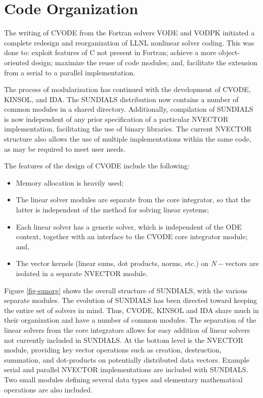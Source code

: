 \section{Code Organization}
\label{s:organization}

The writing of CVODE from the Fortran solvers VODE and VODPK initiated a
complete redesign and reorganization of LLNL nonlinear solver coding.
This was done to: exploit features of C not present in Fortran;
achieve a more object-oriented design; maximize the reuse of code
modules; and, facilitate the extension from a serial to a parallel
implementation.

The process of modularization has continued with the development of CVODE,
KINSOL, and IDA. The SUNDIALS distribution now contains a
number of common modules in a shared directory. Additionally, compilation of
SUNDIALS is now independent of any prior specification of a particular
NVECTOR implementation, facilitating the use of binary libraries. The
current NVECTOR structure also allows the use of multiple implementations within
the same code, as may be required to meet user needs.

The features of the design of CVODE include the following:
\begin{itemize}
\item Memory allocation is heavily used;
\item The linear solver modules are separate from the core integrator,
so that the latter is independent of the method for solving linear
systems;
\item Each linear solver has a generic solver, which is independent of
the ODE context, together with an interface to the CVODE core
integrator module; and, 
\item The vector kernels (linear sums, dot products, norms, etc.) on
$N-$vectors are isolated in a separate NVECTOR module.
\end{itemize}

Figure \ref{fig-sunorg} shows the overall structure of SUNDIALS,
with the various separate modules. The evolution of SUNDIALS has been
directed toward keeping the entire set of solvers in mind. Thus, CVODE, KINSOL and
IDA share much in their organization and have a number of common modules.
The separation of the linear solvers from the core integrators allows for
easy addition of linear solvers not currently included in SUNDIALS. At the
bottom level is the NVECTOR module, providing key vector operations such as
creation, destruction, summation, and dot-products on potentially
distributed data vectors. Example serial and parallel NVECTOR
implementations are included with SUNDIALS. Two small modules defining
several data types and elementary mathematical operations are also included.

